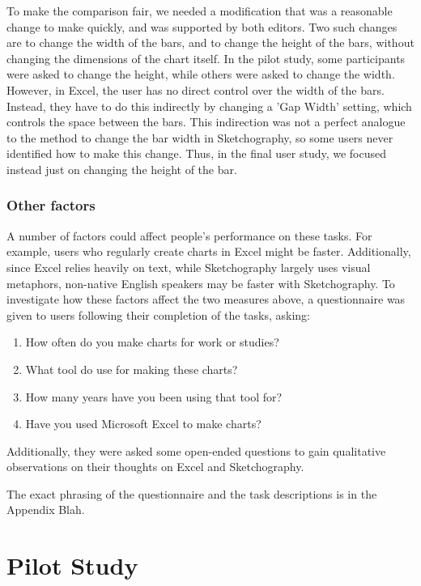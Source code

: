 To make the comparison fair, we needed a modification that was a reasonable change to make quickly, and was supported by both editors. Two such changes are to change the width of the bars, and to change the height of the bars, without changing the dimensions of the chart itself. In the pilot study, some participants were asked to change the height, while others were asked to change the width. However, in Excel, the user has no direct control over the width of the bars. Instead, they have to do this indirectly by changing a 'Gap Width' setting, which controls the space between the bars. This indirection was not a perfect analogue to the method to change the bar width in Sketchography, so some users never identified how to make this change. Thus, in the final user study, we focused instead just on changing the height of the bar.

\subsubsection*{Other factors}
A number of factors could affect people's performance on these tasks. For example, users who regularly create charts in Excel might be faster. Additionally, since Excel relies heavily on text, while Sketchography largely uses visual metaphors, non-native English speakers may be faster with Sketchography. To investigate how these factors affect the two measures above, a questionnaire was given to users following their completion of the tasks, asking:

\begin{enumerate}
\item How often do you make charts for work or studies?
\item What tool do use for making these charts?
\item How many years have you been using that tool for?
\item Have you used Microsoft Excel to make charts?
\end{enumerate}

Additionally, they were asked some open-ended questions to gain qualitative observations on their thoughts on Excel and Sketchography.

The exact phrasing of the questionnaire and the task descriptions is in the Appendix Blah.


\section{Pilot Study}
